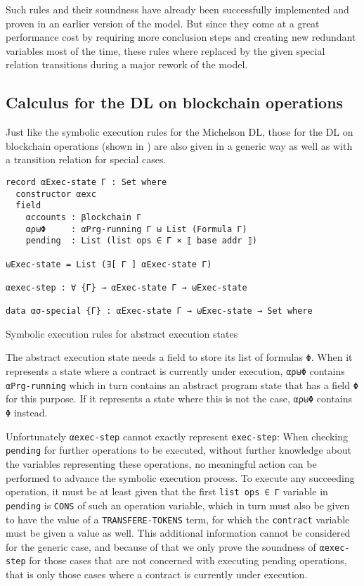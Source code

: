 Such rules and their soundness have already been successfully implemented and proven
in an earlier version of the model.
But since they come at a great performance cost by requiring more conclusion steps
and creating new redundant variables most of the time,
these rules where replaced by the given special relation transitions
during a major rework of the model.

\subsection{Calculus for the DL on blockchain operations}

Just like the symbolic execution rules for the Michelson DL,
those for the DL on blockchain operations (shown in )
are also given in a generic way as well as with a transition relation for special cases.

\begin{listing}[!ht]
\begin{verbatim}
record αExec-state Γ : Set where
  constructor αexc
  field
    αccounts : βlockchain Γ
    αρ⊎Φ     : αPrg-running Γ ⊎ List (Formula Γ)
    pending  : List (list ops ∈ Γ × ⟦ base addr ⟧)

⊎Exec-state = List (∃[ Γ ] αExec-state Γ)

αexec-step : ∀ {Γ} → αExec-state Γ → ⊎Exec-state

data ασ-special {Γ} : αExec-state Γ → ⊎Exec-state → Set where
\end{verbatim}
\caption{Symbolic execution rules for abstract execution states}
\label{aexec-all}
\end{listing}

The abstract execution state needs a field to store its list of formulas \verb/Φ/.
When it represents a state where a contract is currently under execution,
\verb/αρ⊎Φ/ contains \verb/αPrg-running/ which in turn contains an abstract program state
that has a field \verb/Φ/ for this purpose.
If it represents a state where this is not the case, \verb/αρ⊎Φ/ contains \verb/Φ/ instead.

Unfortunately \verb/αexec-step/ cannot exactly represent \verb/exec-step/:
When checking \verb/pending/ for further operations to be executed,
without further knowledge about the variables representing these operations,
no meaningful action can be performed to advance the symbolic execution process.
To execute any succeeding operation, it must be at least given that the first
\verb/list ops ∈ Γ/ variable in \verb/pending/ is \verb/CONS/ of such an operation variable,
which in turn must also be given to have the value of a \verb/TRANSFERE-TOKENS/ term,
for which the \verb/contract/ variable must be given a value as well.
This additional information cannot be considered for the generic case,
and because of that we only prove the soundness of \verb/αexec-step/ for those cases that
are not concerned with executing pending operations, that is only those cases where a
contract is currently under execution.

